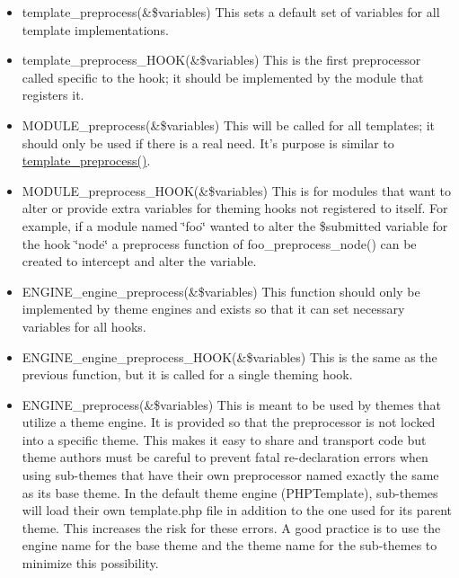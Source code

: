 \begin{itemize}
\item template\_\-preprocess(\&\$variables) This sets a default set of variables for all template implementations.\end{itemize}


\begin{itemize}
\item template\_\-preprocess\_\-HOOK(\&\$variables) This is the first preprocessor called specific to the hook; it should be implemented by the module that registers it.\end{itemize}


\begin{itemize}
\item MODULE\_\-preprocess(\&\$variables) This will be called for all templates; it should only be used if there is a real need. It's purpose is similar to \hyperlink{includes_2theme_8inc_3eeb7bcdba7ef4859f99586da264d347}{template\_\-preprocess()}.\end{itemize}


\begin{itemize}
\item MODULE\_\-preprocess\_\-HOOK(\&\$variables) This is for modules that want to alter or provide extra variables for theming hooks not registered to itself. For example, if a module named \char`\"{}foo\char`\"{} wanted to alter the \$submitted variable for the hook \char`\"{}node\char`\"{} a preprocess function of foo\_\-preprocess\_\-node() can be created to intercept and alter the variable.\end{itemize}


\begin{itemize}
\item ENGINE\_\-engine\_\-preprocess(\&\$variables) This function should only be implemented by theme engines and exists so that it can set necessary variables for all hooks.\end{itemize}


\begin{itemize}
\item ENGINE\_\-engine\_\-preprocess\_\-HOOK(\&\$variables) This is the same as the previous function, but it is called for a single theming hook.\end{itemize}


\begin{itemize}
\item ENGINE\_\-preprocess(\&\$variables) This is meant to be used by themes that utilize a theme engine. It is provided so that the preprocessor is not locked into a specific theme. This makes it easy to share and transport code but theme authors must be careful to prevent fatal re-declaration errors when using sub-themes that have their own preprocessor named exactly the same as its base theme. In the default theme engine (PHPTemplate), sub-themes will load their own template.php file in addition to the one used for its parent theme. This increases the risk for these errors. A good practice is to use the engine name for the base theme and the theme name for the sub-themes to minimize this possibility.\end{itemize}


